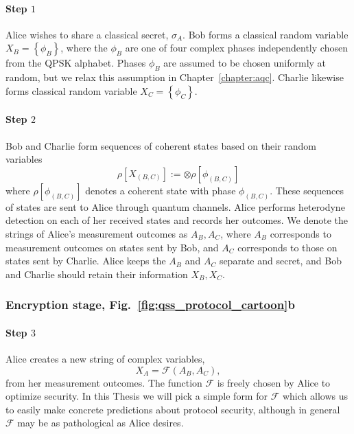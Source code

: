 \paragraph{Step $1$}
Alice wishes to share a classical secret, $\sigma_A$. Bob forms a classical random variable $X_B = \left\{\phi_B\right\}$, where the $\phi_B$ are one of four complex phases independently chosen from the QPSK alphabet. Phases $\phi_B$ are assumed to be chosen uniformly at random, but we relax this assumption in Chapter~\ref{chapter:aqc}. Charlie likewise forms classical random variable $X_C = \left\{\phi_C\right\}$.

\paragraph{Step $2$}
Bob and Charlie form sequences of coherent states based on their random variables
\begin{equation}
\rho\left[X_{\left(B, C\right)}\right] := \otimes \rho\left[\phi_{\left(B, C\right)}\right]
\end{equation}
where $\rho\left[\phi_{\left(B, C\right)}\right]$ denotes a coherent state with phase $\phi_{\left(B, C\right)}$. These sequences of states are sent to Alice through quantum channels. %
Alice performs heterodyne detection on each of her received states and records her outcomes. We denote the strings of Alice's measurement outcomes as $A_B, A_C$, where $A_B$ corresponds to measurement outcomes on states sent by Bob, and $A_C$ corresponds to those on states sent by Charlie. Alice keeps the $A_B$ and $A_C$ separate and secret, and Bob and Charlie should retain their information $X_B, X_C$.

\subsubsection*{Encryption stage, Fig.~\ref{fig:qss_protocol_cartoon}b}

\paragraph{Step $3$} Alice creates a new string of complex variables,
\begin{equation}
X_A = \mathcal{F}\left(A_B, A_C\right),
\end{equation}
from her measurement outcomes. The function $\mathcal{F}$ is freely chosen by Alice to optimize security. In this Thesis we will pick a simple form for $\mathcal{F}$ which allows us to easily make concrete predictions about protocol security, although in general $\mathcal{F}$ may be as pathological as Alice desires.


